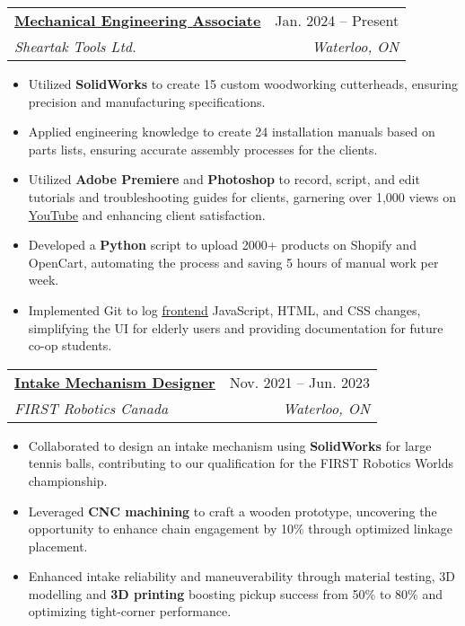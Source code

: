 \documentclass[letterpaper]{article}
\makeatletter
\newcommand{\resumeItem}[1]{
  \item\small{
    {#1 \vspace{-2pt}}
  }
}
\newcommand{\resumeSubheading}[4]{
  \vspace{-2pt}\item
    \begin{tabular*}{0.97\textwidth}[t]{l@{\extracolsep{\fill}}r}
      \textbf{#1} & #2 \\
      \textit{\small#3} & \textit{\small #4} \\
    \end{tabular*}\vspace{-7pt}
}
\newcommand{\resumeItemListStart}{\begin{itemize}}
\newcommand{\resumeItemListEnd}{\end{itemize}\vspace{-5pt}}
\makeatother
\begin{document}
    \resumeSubheading
      {\underline{\href{https://www.youtube.com/playlist?list=PL2zKq55_kXLeLsMzZH8ny8A34vHwAoc7n}{Mechanical Engineering Associate}}}{Jan. 2024 -- Present}
      {Sheartak Tools Ltd.}{Waterloo, ON}
      \resumeItemListStart
        \resumeItem{Utilized \textbf{SolidWorks} to create 15 custom woodworking cutterheads, ensuring precision and manufacturing specifications.}
        \resumeItem{Applied engineering knowledge to create 24 installation manuals based on parts lists, ensuring accurate assembly processes for the clients.}
        \resumeItem{Utilized \textbf{Adobe Premiere} and \textbf{Photoshop} to record, script, and edit tutorials and troubleshooting guides for clients, garnering over 1,000 views on \underline{\href{https://www.youtube.com/playlist?list=PL2zKq55_kXLeLsMzZH8ny8A34vHwAoc7n}{YouTube}} and enhancing client satisfaction.}
        \resumeItem{Developed a \textbf{Python} script to upload 2000+ products on Shopify and OpenCart, automating the process and saving 5 hours of manual work per week.}
        \resumeItem{Implemented Git to log \underline{\href{https://sheartak.ca/}{frontend}} JavaScript, HTML, and CSS changes, simplifying the UI for elderly users and providing documentation for future co-op students.}
      \resumeItemListEnd

    \resumeSubheading
      {\underline{\href{https://www.gavintranquilino.com/rapid-react.html}{Intake Mechanism Designer}}}{Nov. 2021 -- Jun. 2023}
      {FIRST Robotics Canada}{Waterloo, ON}
      \resumeItemListStart
        \resumeItem{Collaborated to design an intake mechanism using \textbf{SolidWorks} for large tennis balls, contributing to our qualification for the FIRST Robotics Worlds championship.}
        \resumeItem{Leveraged \textbf{CNC machining} to craft a wooden prototype, uncovering the opportunity to enhance chain engagement by 10\% through optimized linkage placement.}
        \resumeItem{Enhanced intake reliability and maneuverability through material testing, 3D modelling and \textbf{3D printing} boosting pickup success from 50\% to 80\% and optimizing tight-corner performance.}
      \resumeItemListEnd
\end{document}
